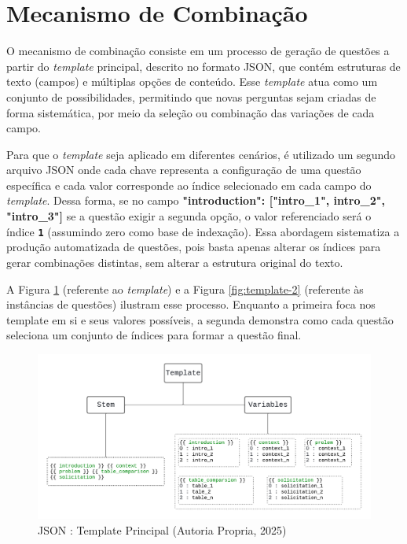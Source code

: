 \section{Mecanismo de Combinação}

O mecanismo de combinação consiste em um processo de geração de questões a partir do \textit{template} principal, descrito no formato JSON, que contém estruturas de texto (campos) e múltiplas opções de conteúdo. Esse \textit{template} atua como um conjunto de possibilidades, permitindo que novas perguntas sejam criadas de forma sistemática, por meio da seleção ou combinação das variações de cada campo.

Para que o \textit{template} seja aplicado em diferentes cenários, é utilizado um segundo arquivo JSON onde cada chave representa a configuração de uma questão específica e cada valor corresponde ao índice selecionado em cada campo do \textit{template}. Dessa forma, se no campo \textbf{"introduction": ["intro\_1", intro\_2", "intro\_3"]} se a questão exigir a segunda opção, o valor referenciado será o índice \texttt{\textbf{1}} (assumindo zero como base de indexação). Essa abordagem sistematiza a produção automatizada de questões, pois basta apenas alterar os índices para gerar combinações distintas, sem alterar a estrutura original do texto.

A Figura \ref{fig:template-1} (referente ao \textit{template}) e a Figura \ref{fig:template-2} (referente às instâncias de questões) ilustram esse processo. Enquanto a primeira foca nos template em si e seus valores possíveis, a segunda demonstra como cada questão seleciona um conjunto de índices para formar a questão final. 

\begin{figure}[ht]
	\centering
	\includegraphics[width=14cm]{./imagens/capitulo5/template-1}
	\caption{JSON : Template Principal (Autoria Propria, 2025) }
	\label{fig:template-1}
\end{figure}

